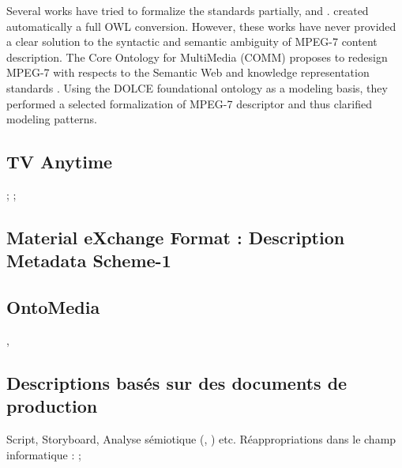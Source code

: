 Several works have tried to formalize the standards partially, \cite{Hunter2001} and \cite{Tsinaraki2004}. \cite{Garcia2005} created automatically a full OWL conversion. However, these works have never provided a clear solution to the syntactic and semantic ambiguity of MPEG-7 content description. The Core Ontology for MultiMedia (COMM) proposes to redesign MPEG-7 with respects to the Semantic Web and knowledge representation standards \cite{Arndt2007}. Using the DOLCE foundational ontology as a modeling basis, they performed a selected formalization of MPEG-7 descriptor and thus clarified modeling patterns. 






\subsection{TV Anytime}
\cite{Evain2000} ; \cite{Tsinaraki2004} ; \cite{Tsinaraki2005}

\subsection{Material eXchange Format : Description Metadata Scheme-1}
\cite{Marcos2009}

\subsection{OntoMedia}
\cite{Lee2012a}, \cite{Burger2011}



\subsection{Descriptions basés sur des documents de production}
Script, Storyboard, Analyse sémiotique (\cite{Martin2005}, \cite{ThiBui2003}) etc.
Réappropriations dans le champ informatique : \cite{Chakravarthy2009b} ; \cite{Chakravarthy2009c}

